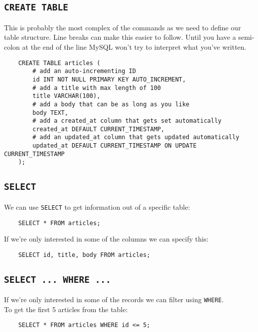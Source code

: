 \subsection{\texttt{CREATE TABLE}}

This is probably the most complex of the commands as we need to define our table structure. Line breaks can make this easier to follow. Until you have a semi-colon at the end of the line MySQL won't try to interpret what you've written.

\begin{verbatim}
    CREATE TABLE articles (
        # add an auto-incrementing ID
        id INT NOT NULL PRIMARY KEY AUTO_INCREMENT,
        # add a title with max length of 100
        title VARCHAR(100),
        # add a body that can be as long as you like
        body TEXT,
        # add a created_at column that gets set automatically
        created_at DEFAULT CURRENT_TIMESTAMP,
        # add an updated_at column that gets updated automatically
        updated_at DEFAULT CURRENT_TIMESTAMP ON UPDATE CURRENT_TIMESTAMP
    );
\end{verbatim}

\subsection{\texttt{SELECT}}

We can use \texttt{SELECT} to get information out of a specific table:

\begin{verbatim}
    SELECT * FROM articles;
\end{verbatim}

If we're only interested in some of the columns we can specify this:

\begin{verbatim}
    SELECT id, title, body FROM articles;
\end{verbatim}

\subsection{\texttt{SELECT ... WHERE ...}}

If we're only interested in some of the records we can filter using \texttt{WHERE}.
\\

To get the first 5 articles from the table:

\begin{verbatim}
    SELECT * FROM articles WHERE id <= 5;
\end{verbatim}

